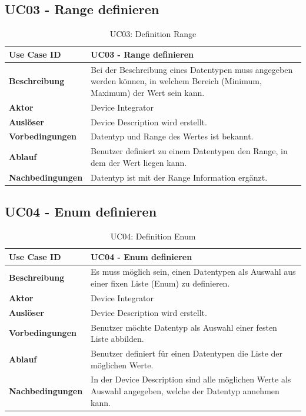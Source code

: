 \subsection{UC03 - Range definieren}

\begin{table}[H]
\begin{tabularx}{\textwidth}{|l|X|}

 \hline
 {\bf Use Case ID }    & UC03 - Range definieren \\  \hline
 {\bf Beschreibung }   & Bei der Beschreibung eines Datentypen muss angegeben werden können, in welchem Bereich (Minimum, Maximum) der Wert sein kann. \\ \hline
 {\bf Aktor }          & Device Integrator \\ \hline
 {\bf Auslöser }       & Device Description wird erstellt. \\ \hline
 {\bf Vorbedingungen } & Datentyp und Range des Wertes ist bekannt. \\ \hline
 {\bf Ablauf }         & Benutzer definiert zu einem Datentypen den Range, in dem der Wert liegen kann. \\ \hline
 {\bf Nachbedingungen} & Datentyp ist mit der Range Information ergänzt. \\ \hline
  
\end{tabularx}
\caption{UC03: Definition Range}
\end{table}

\subsection{UC04 - Enum definieren}
\begin{table}[H]
\begin{tabularx}{\textwidth}{|l|X|}

 \hline
 {\bf Use Case ID }    & UC04 - Enum definieren \\  \hline
 {\bf Beschreibung }   & Es muss möglich sein, einen Datentypen als Auswahl aus einer fixen Liste (Enum) zu definieren. \\ \hline
 {\bf Aktor }          & Device Integrator \\ \hline
 {\bf Auslöser }       & Device Description wird erstellt. \\ \hline
 {\bf Vorbedingungen } & Benutzer möchte Datentyp als Auswahl einer festen Liste abbilden. \\ \hline
 {\bf Ablauf }         & Benutzer definiert für einen Datentypen die Liste der möglichen Werte. \\ \hline
 {\bf Nachbedingungen} & In der Device Description sind alle möglichen Werte als Auswahl angegeben, welche der Datentyp annehmen kann.\\ \hline
  
\end{tabularx}
\caption{UC04: Definition Enum}
\end{table}

